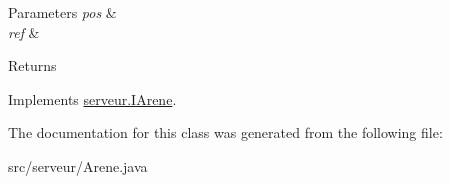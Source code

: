 \begin{DoxyParams}{Parameters}
{\em pos} & \\
\hline
{\em ref} & \\
\hline
\end{DoxyParams}
\begin{DoxyReturn}{Returns}

\end{DoxyReturn}


Implements \hyperlink{interfaceserveur_1_1_i_arene_a47a37dbadfd6418b184e2c9f41faec01}{serveur.\-I\-Arene}.



The documentation for this class was generated from the following file\-:\begin{DoxyCompactItemize}
\item 
src/serveur/Arene.\-java\end{DoxyCompactItemize}
